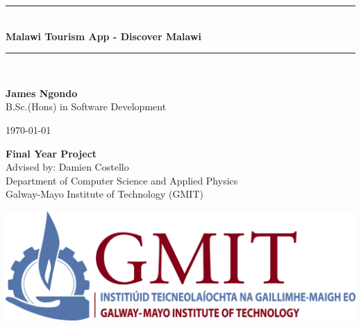 \documentclass[12pt,a4paper,oneside,openany]{book}
\newcommand{\projecttitle}{Malawi Tourism App - Discover Malawi}
\newcommand{\projectauthor}{James Ngondo}
\newcommand{\projectadvisor}{Damien Costello}
\newcommand{\projectprogramme}{B.Sc.(Hons) in Software Development}
\newcommand{\projectdate}{\today}
\begin{document}
	\begin{titlepage}
		\begin{minipage}[t][6cm]{\textwidth}
			\centering
			\rule{\linewidth}{0.5mm} \\[0.4cm]
			{ \LARGE \bfseries \projecttitle \\[0.4cm] }
			\rule{\linewidth}{0.5mm} \\[0.8cm]
		\end{minipage}
		
		\begin{minipage}[t][6.5cm]{\textwidth}
			\centering
			\textbf{\projectauthor}\\[0.5cm]
			\projectprogramme
		\end{minipage}
		
		\begin{minipage}[t][1cm]{\textwidth}
			\centering
			\textsc{\projectdate}
		\end{minipage}
		
		\begin{minipage}[t][3cm]{\textwidth}
			\centering
			\textbf{Final Year Project}\\[0.3cm]
			Advised by: \projectadvisor \\[0.1cm]
			Department of Computer Science and Applied Physics\\
			Galway-Mayo Institute of Technology (GMIT)
		\end{minipage}
		
		\begin{center}    
			\includegraphics{img/gmit-logo.jpg}
		\end{center}
	\end{titlepage}
	\setcounter{page}{2}
	\tableofcontents
	
	
	
\end{document}
